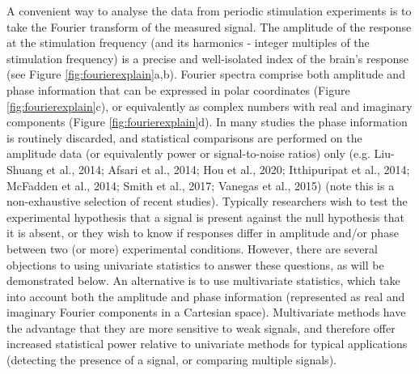 \documentclass[]{article}
\begin{document}
A convenient way to analyse the data from periodic stimulation experiments is to take the Fourier transform of the measured signal. The amplitude of the response at the stimulation frequency (and its harmonics - integer multiples of the stimulation frequency) is a precise and well-isolated index of the brain's response (see Figure \ref{fig:fourierexplain}a,b). Fourier spectra comprise both amplitude and phase information that can be expressed in polar coordinates (Figure \ref{fig:fourierexplain}c), or equivalently as complex numbers with real and imaginary components (Figure \ref{fig:fourierexplain}d). In many studies the phase information is routinely discarded, and statistical comparisons are performed on the amplitude data (or equivalently power or signal-to-noise ratios) only (e.g. Liu-Shuang et al., 2014; Afsari et al., 2014; Hou et al., 2020; Itthipuripat et al., 2014; McFadden et al., 2014; Smith et al., 2017; Vanegas et al., 2015) (note this is a non-exhaustive selection of recent studies). Typically researchers wish to test the experimental hypothesis that a signal is present against the null hypothesis that it is absent, or they wish to know if responses differ in amplitude and/or phase between two (or more) experimental conditions. However, there are several objections to using univariate statistics to answer these questions, as will be demonstrated below. An alternative is to use multivariate statistics, which take into account both the amplitude and phase information (represented as real and imaginary Fourier components in a Cartesian space). Multivariate methods have the advantage that they are more sensitive to weak signals, and therefore offer increased statistical power relative to univariate methods for typical applications (detecting the presence of a signal, or comparing multiple signals).
\end{document}
